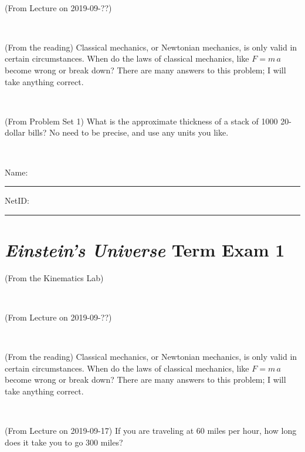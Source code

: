 \documentclass[12pt, letterpaper]{article}
\begin{document}
\vfill ~

\begin{problem} (From Lecture on 2019-09-??)
\end{problem}


\vfill ~

\begin{problem} (From the reading)
Classical mechanics, or Newtonian mechanics, is only valid in certain
circumstances. When do the laws of classical mechanics, like $F =
m\,a$ become wrong or break down? There are many answers to this
problem; I will take anything correct.
\end{problem}


\vfill ~

\begin{problem} (From Problem Set 1)
What is the approximate thickness of a stack of 1000 20-dollar bills?
No need to be precise, and use any units you like.
\end{problem}


\vfill ~


\cleardoublepage



\noindent
Name: \rule[-1ex]{0.60\textwidth}{0.1pt}
NetID: \rule[-1ex]{0.20\textwidth}{0.1pt}

\section*{\textsl{Einstein's Universe} Term Exam 1}
\setcounter{problem}{1}


\begin{problem} (From the Kinematics Lab)

\end{problem}


\vfill ~

\begin{problem} (From Lecture on 2019-09-??)
\end{problem}


\vfill ~

\begin{problem} (From the reading)
Classical mechanics, or Newtonian mechanics, is only valid in certain
circumstances. When do the laws of classical mechanics, like $F =
m\,a$ become wrong or break down? There are many answers to this
problem; I will take anything correct.
\end{problem}


\vfill ~

\begin{problem} (From Lecture on 2019-09-17)
If you are traveling at 60 miles per hour, how long does
it take you to go 300 miles?
\end{problem}
\end{document}
